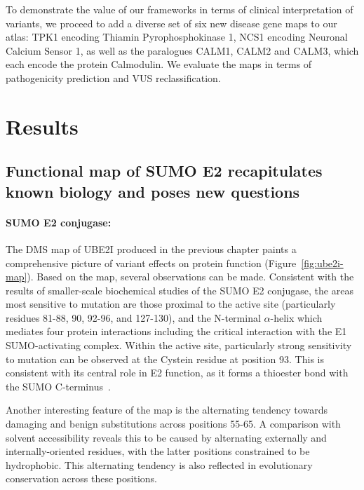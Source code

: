 To demonstrate the value of our frameworks in terms of clinical interpretation of variants, we proceed to add a diverse set of six new disease gene maps to our atlas: TPK1 encoding Thiamin Pyrophosphokinase 1, NCS1 encoding Neuronal Calcium Sensor 1, as well as the paralogues CALM1, CALM2 and CALM3, which each encode the protein Calmodulin. We evaluate the maps in terms of pathogenicity prediction and VUS reclassification.

\section{Results}


\subsection{Functional map of SUMO E2 recapitulates known biology and poses new questions}


\paragraph{SUMO E2 conjugase:} The DMS map of UBE2I produced in the previous chapter paints a comprehensive picture of variant effects on protein function (Figure~\ref{fig:ube2i-map}). Based on the map, several observations can be made. Consistent with the results of smaller-scale biochemical studies of the SUMO E2 conjugase\cite{bencsath_identification_2002,bernier-villamor_structural_2002}, the areas most sensitive to mutation are those proximal to the active site (particularly residues 81-88, 90, 92-96, and 127-130), and the N-terminal $\alpha$-helix which mediates four protein interactions including the critical interaction with the E1 SUMO-activating complex. Within the active site, particularly strong sensitivity to mutation can be observed at the Cystein residue at position 93. This is consistent with its central role in E2 function, as it forms a thioester bond with the SUMO C-terminus~\cite{bernier-villamor_structural_2002}.

Another interesting feature of the map is the alternating tendency towards damaging and benign substitutions across positions 55-65. A comparison with solvent accessibility reveals this to be caused by alternating externally and internally-oriented residues, with the latter positions constrained to be hydrophobic. This alternating tendency is also reflected in evolutionary conservation across these positions. 

